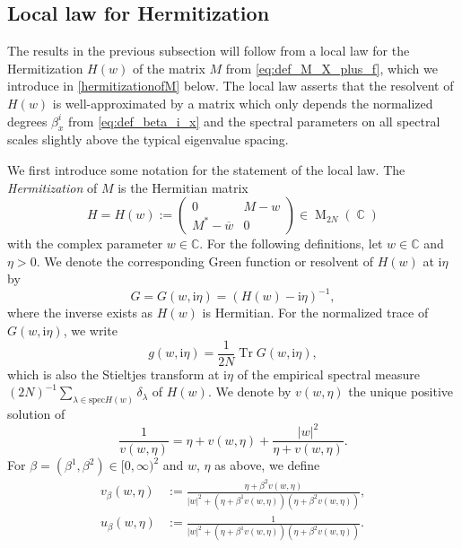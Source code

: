 \documentclass[10pt,a4paper]{amsart}
\DeclareMathOperator{\Tr}{Tr}
\DeclareMathOperator{\CC}{\mathbb{C}}
\DeclareMathOperator{\Mat}{\mathrm{M}}
\newcommand{\ii}{\mathrm{i}}
\newcommand{\abs}[1]{\left| #1 \right|}
\newcommand{\C}{\mathbb{C}}
\numberwithin{equation}{section}
\begin{document}
	\subsection{Local law for Hermitization} 
	
	
	
	
	The results in the previous subsection will follow from a local law for the Hermitization $H(w)$ of the matrix 
	$M$ from \cref{eq:def_M_X_plus_f}, which we introduce in \cref{hermitizationofM} below.
	The local law asserts that the resolvent of $H(w)$ is well-approximated by a matrix 
	which only depends the normalized degrees $\beta_x^i$ from \cref{eq:def_beta_i_x} and the spectral parameters on all spectral scales slightly above the typical eigenvalue spacing. 
	
	We first introduce some notation for the statement of the local law.  
	The \emph{Hermitization} of $M$ is the Hermitian matrix 
	\begin{equation}\label{hermitizationofM}
		H=H(w) :=\begin{pmatrix} 
			0                       &       M-w \\
			
			M^{\ast}- \overline{w} & 0
		\end{pmatrix}  \in \Mat_{2N}(\CC) 
	\end{equation}
	with the complex parameter $w \in\C$. 
	For the following definitions, let $w \in \C$ and $\eta >0$.
	We denote the corresponding Green function or resolvent of $H(w)$ at $\ii \eta$ by 
	\begin{equation}\label{Greenfunction}
		G=G(w,\ii\eta) = (H(w)- \ii \eta)^{-1}, 
	\end{equation}
	where the inverse exists as $H(w)$ is Hermitian. 
	For the normalized trace of $G(w,\ii \eta)$, we write 
	\begin{equation} \label{eq:def_g} 
		g(w,\ii \eta) = \frac{1}{2N} \Tr G(w,\ii \eta),  
	\end{equation} 
	which is also the Stieltjes transform at $\ii \eta$ of the empirical spectral measure $(2N)^{-1} \sum_{\lambda \in \mathrm{spec}H(w)}\delta_\lambda$ of $H(w)$.  
	We denote by $v(w,\eta)$ the unique positive solution of 
	\begin{equation} \label{eq:v} 
		\frac{1}{v(w,\eta)}= \eta + v(w,\eta) + \frac{\abs{w}^2}{\eta + v(w,\eta)}. 
	\end{equation} 
	For $\beta= (\beta^1,\beta^2) \in[0,\infty)^2$ and $w$, $\eta$ as above, we define  
	\begin{align}  
		v_\beta(w,\eta) & := \frac{\eta + \beta^2 v(w,\eta)}{\abs{w}^2 + (\eta + \beta^1 v(w,\eta))(\eta + \beta^2 v(w,\eta))},  
		\label{eq:def_v_beta}\\ 
		u_\beta(w,\eta) & := \frac{1}{\abs{w}^2 + (\eta + \beta^1 v(w,\eta))(\eta + \beta^2 v(w,\eta))}. 
		\label{eq:def_u_beta} 
	\end{align} 
\end{document}
